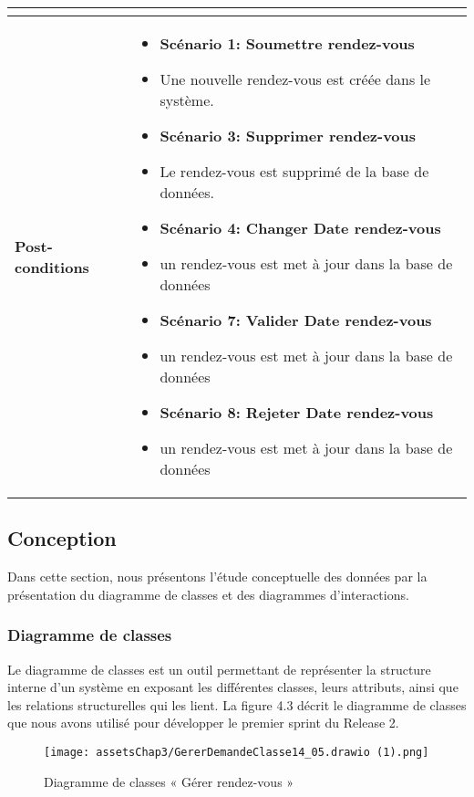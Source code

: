 \begin{longtable}{|>{\arraybackslash}p{4.2cm}|>{\arraybackslash}p{12.5cm}|}
\begin{itemize}[label=]
\end{itemize} \\
\hline

\textbf{Post-conditions} &
\begin{itemize}[label=]
 \item\textbf{Scénario 1: Soumettre rendez-vous}
 \item Une nouvelle rendez-vous est créée dans le système.
  \item\textbf{Scénario 3: Supprimer rendez-vous }
 \item Le rendez-vous est supprimé de la base de données.
  \item\textbf{Scénario 4: Changer Date rendez-vous }
\item un rendez-vous est met à jour dans la base de données
\item\textbf{Scénario 7: Valider Date rendez-vous }
\item un rendez-vous est met à jour dans la base de données
\item\textbf{Scénario 8: Rejeter Date rendez-vous }
\item un rendez-vous est met à jour dans la base de données

\end{itemize} \\



\end{longtable}



\subsection{Conception}
Dans cette section, nous présentons l'étude conceptuelle des données par la présentation du
diagramme de classes et des diagrammes d'interactions.
\subsubsection{Diagramme de classes}
Le diagramme de classes est un outil permettant de représenter la structure interne d'un
système en exposant les différentes classes, leurs attributs, ainsi que les relations structurelles
qui les lient.
La figure 4.3 décrit le diagramme de classes que nous avons utilisé pour développer le premier
sprint du Release 2.
\begin{figure}[H]
\centering
\texttt{[image: assetsChap3/GererDemandeClasse14\_05.drawio (1).png]}
\caption{ Diagramme de classes « Gérer rendez-vous  » }
\end{figure}

